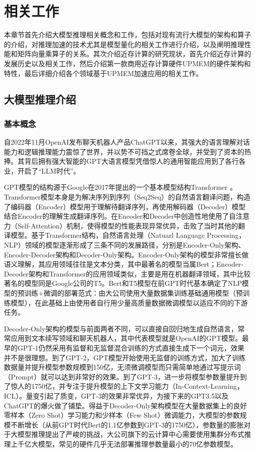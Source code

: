 \chapter{相关工作}

本章节首先介绍大模型推理相关概念和工作，包括对现有流行大模型的架构和算子的介绍，对推理加速的技术尤其是模型量化的相关工作进行介绍，以及阐明推理性能和矩阵向量乘算子的关系。其次介绍近存计算的研究现状，首先介绍近存计算的发展历史以及相关工作，然后介绍第一款商用近存计算硬件UPMEM的硬件架构和特性，最后详细介绍各个领域基于UPMEM加速应用的相关工作。

\section{大模型推理介绍}

\subsection{基本概念}
自2022年11月OpenAI发布聊天机器人产品ChatGPT以来，其强大的语言理解对话能力和逻辑推理能力震惊了世界，并以势不可挡之式席卷全球，并受到了资本的热捧。其背后拥有强大智能的GPT大语言模型凭借惊人的通用智能应用到了各行各业，开启了“LLM时代”。

GPT模型的结构源于Google在2017年提出的一个基本模型结构Transformer \cite{Transformer}。Transformer模型本身是为解决序列到序列（Seq2Seq）的自然语言翻译问题，构造了编码器（Encoder）模型用于理解待翻译序列，再使用解码器（Decoder）模型结合Encoder的理解生成翻译序列。在Encoder和Decoder中创造性地使用了自注意力（Self-Attention）机制，使得模型的性能表现异常优异，击败了当时其他的翻译模型。基于Transformer结构，自然语言处理（Natuarl Language Processing，NLP）领域的模型逐渐形成了三条不同的发展路径，分别是Encoder-Only架构、Encoder-Decoder架构和Decoder-Only架构。Encoder-Only架构的模型非常擅长做语义理解，其应用领域往往是文本分类，其中最著名的模型当属Bert\cite{Bert}；Encoder-Decoder架构和Transformer的应用领域类似，主要是用在机器翻译领域，其中比较著名的模型同是Google公司的T5\cite{T5}。Bert和T5模型在前GPT时代基本确定了NLP模型的预训练+微调的部署范式：由大公司使用大量数据集训练基础通用模型（预训练模型），在此基础上由使用者自行用少量高质量数据微调模型以适应不同的下游任务。

Decoder-Only架构的模型与前面两者不同，可以直接自回归地生成自然语言，常常应用到文本续写领域和聊天机器人，其中代表模型就是OpenAI的GPT模型。最早的GPT-1\cite{GPT-1}仍然采用有监督和无监督混合训练的方式直接生成下一个词元，效果并不是很理想。到了GPT-2\cite{GPT-2}，GPT模型开始使用无监督的训练方式，加大了训练数据量并提升模型参数规模到150亿，无须微调模型而只需简单地通过写提示词（Prompt）就可以达到非常好的效果。到了GPT-3\cite{GPT-3}，进一步将模型参数量提升到了惊人的1750亿，并专注于提升模型的上下文学习能力（In-Context-Learning，ICL）。量变引起了质变，GPT-3的效果非常优异，为接下来的GPT3.5以及ChatGPT的爆火做了铺垫。得益于Decoder-Only架构模型在大量数据集上的良好零样本（Zero Shot）学习能力\cite{Zero-Shot}和少样本（Few Shot）微调能力\cite{Few-Shot}，大模型的参数规模不断增长（从前GPT时代Bert的1.1亿参数到GPT-3的1750亿），参数量的膨胀对于大模型推理提出了严峻的挑战，大公司旗下的云计算中心需要使用集群分布式推理上千亿大模型，常见的硬件几乎无法部署推理参数量最小的70亿参数模型。

